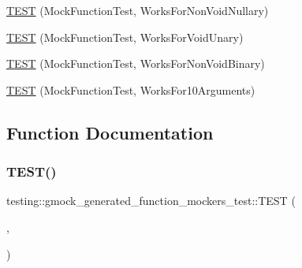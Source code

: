 \begin{DoxyCompactItemize}
\item 
\hyperlink{namespacetesting_1_1gmock__generated__function__mockers__test_a90817999d7f25ecf280453efb157db84}{T\+E\+ST} (Mock\+Function\+Test, Works\+For\+Non\+Void\+Nullary)
\item 
\hyperlink{namespacetesting_1_1gmock__generated__function__mockers__test_ab0e1ede6a1f6ef1774e27f5793a33599}{T\+E\+ST} (Mock\+Function\+Test, Works\+For\+Void\+Unary)
\item 
\hyperlink{namespacetesting_1_1gmock__generated__function__mockers__test_ab6337da98bc6bc97100ab177386f3b2b}{T\+E\+ST} (Mock\+Function\+Test, Works\+For\+Non\+Void\+Binary)
\item 
\hyperlink{namespacetesting_1_1gmock__generated__function__mockers__test_aa92f0b2b98d76f2c881103a19bed7ba6}{T\+E\+ST} (Mock\+Function\+Test, Works\+For10\+Arguments)
\end{DoxyCompactItemize}


\subsection{Function Documentation}
\mbox{\label{namespacetesting_1_1gmock__generated__function__mockers__test_ae0d5aa8e715f3c183f1ccdcf390187e7}} 
\subsubsection{\texorpdfstring{T\+E\+S\+T()}{TEST()}\hspace{0.1cm}{\footnotesize\ttfamily [1/10]}}
{\footnotesize\ttfamily testing\+::gmock\+\_\+generated\+\_\+function\+\_\+mockers\+\_\+test\+::\+T\+E\+ST (\begin{DoxyParamCaption}\item[{Expect\+Call\+Test}]{,  }\item[{Unmentioned\+Function\+Can\+Be\+Called\+Any\+Number\+Of\+Times}]{ }\end{DoxyParamCaption})}

\mbox{\label{namespacetesting_1_1gmock__generated__function__mockers__test_a5f59a7b507101fc0dbb558c090974f02}} 
